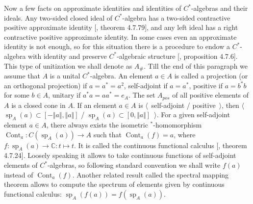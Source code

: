 Now a few facts on approximate identities and identities of $C^*$-algebras and
their ideals. Any two-sided closed ideal of $C^*$-algebra has a two-sided
contractive positive approximate identity [\cite{HelBanLocConvAlg}, theorem
4.7.79], and any left ideal has a right contractive positive approximate
identity. In some cases even an approximate identity is not enough, so for this
situation there is a procedure to endow a $C^*$-algebra with identity and
preserve $C^*$-algebraic structure [\cite{HelBanLocConvAlg}, proposition 4.7.6].
This type of unitization we shall denote as $A_\#$. Till the end of this
paragraph we assume that $A$ is a unital $C^*$-algebra. An element $a\in A$ is
called a projection (or an orthogonal projection) if $a=a^*=a^2$, self-adjoint
if $a=a^*$, positive if $a=b^*b$ for some $b\in A$, unitary if $a^*a=aa^*=e_A$.
The set $A_{pos}$ of all positive elements of $A$ is a closed cone in $A$. If an
element $a\in A$ is $\langle$~self-adjoint / positive~$\rangle$, then
$\langle$~$\operatorname{sp}_A(a)\subset[-\Vert a\Vert, \Vert a\Vert]$ /
$\operatorname{sp}_A(a)\subset[0,\Vert a\Vert]$~$\rangle$. For a given
self-adjoint element $a\in A$, there always exists the isometric
${}^*$-homomorphism $\operatorname{Cont}_a:C(\operatorname{sp}_A(a))\to A$ such
that $\operatorname{Cont}_a(f)=a$, where
$f:\operatorname{sp}_A(a)\to\mathbb{C}:t\mapsto t$. It is called the continuous
functional calculus [\cite{HelBanLocConvAlg}, theorem 4.7.24]. Loosely speaking
it allows to take continuous functions of self-adjoint elements of
$C^*$-algebras, so following standard convention we shall write $f(a)$ instead
of $\operatorname{Cont}_a(f)$. Another related result called the spectral
mapping theorem allows to compute the spectrum of elements given by continuous
functional calculus: $\operatorname{sp}_A(f(a))=f(\operatorname{sp}_A(a))$.

